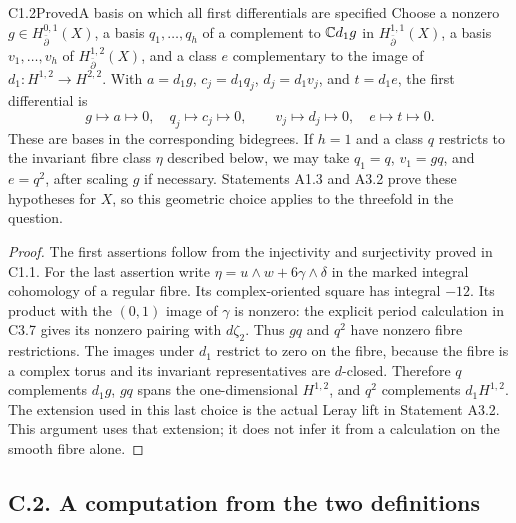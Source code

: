 \begin{claim}{C1.2}{Proved}{A basis on which all first differentials are specified}
Choose a nonzero $g\in H^{0,1}_{\bar\partial}(X)$, a basis
$q_1,\ldots,q_h$ of a complement to $\mathbb C d_1g$ in
$H^{1,1}_{\bar\partial}(X)$, a basis $v_1,\ldots,v_h$ of
$H^{1,2}_{\bar\partial}(X)$, and a class $e$ complementary to the
image of $d_1:H^{1,2}\to H^{2,2}$.  With
$a=d_1g$, $c_j=d_1q_j$, $d_j=d_1v_j$, and $t=d_1e$, the first
differential is
\[
g\mapsto a\mapsto0,\quad q_j\mapsto c_j\mapsto0,
\qquad v_j\mapsto d_j\mapsto0,\quad e\mapsto t\mapsto0.
\]
These are bases in the corresponding bidegrees.  If $h=1$ and a
class $q$ restricts to the invariant fibre class $\eta$ described below,
we may take $q_1=q$, $v_1=gq$, and $e=q^2$, after scaling $g$ if
necessary.  Statements A1.3 and A3.2 prove these hypotheses for $X$,
so this geometric choice applies to the threefold in the question.
\end{claim}
\begin{proof}
The first assertions follow from the injectivity and surjectivity
proved in C1.1.  For the last assertion write
$\eta=u\wedge w+6\gamma\wedge\delta$ in the marked integral
cohomology of a regular fibre.  Its complex-oriented square has
integral $-12$.  Its product with the $(0,1)$ image of $\gamma$ is
nonzero: the explicit period calculation in C3.7 gives its nonzero
pairing with $d\zeta_2$.  Thus $gq$ and $q^2$ have nonzero fibre
restrictions.  The images under $d_1$ restrict to zero on the fibre,
because the fibre is a complex torus and its invariant representatives
are $d$-closed.  Therefore $q$ complements $d_1g$, $gq$ spans the
one-dimensional $H^{1,2}$, and $q^2$ complements $d_1H^{1,2}$.
The extension used in this last choice is the actual Leray lift in
Statement A3.2.  This argument uses that extension; it does not infer
it from a calculation on the smooth fibre alone.
\end{proof}

\subsection{C.2. A computation from the two definitions}

